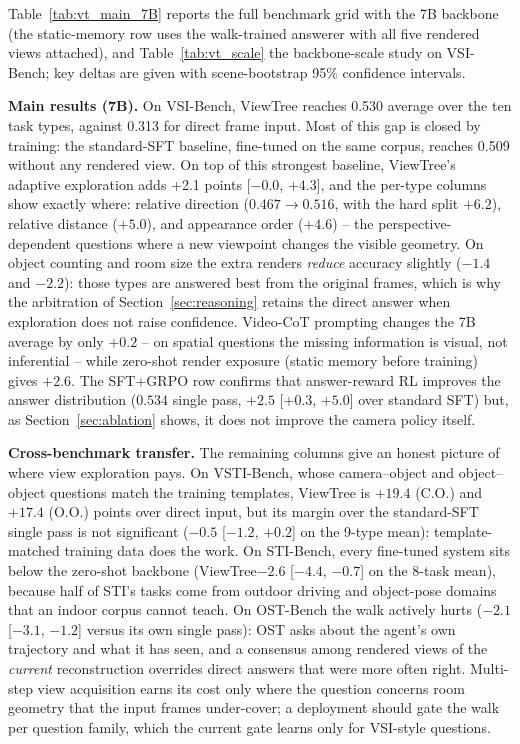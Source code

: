 \documentclass[sigconf,10pt]{acmart}
\newcommand{\system}{ViewTree\xspace}
\begin{document}
Table~\ref{tab:vt_main_7B} reports the full benchmark grid with the 7B backbone (the static-memory row uses the walk-trained answerer with all five rendered views attached), and Table~\ref{tab:vt_scale} the backbone-scale study on VSI-Bench; key deltas are given with scene-bootstrap 95\% confidence intervals.

\noindent\textbf{Main results (7B).} On VSI-Bench, \system reaches 0.530 average over the ten task types, against 0.313 for direct frame input. Most of this gap is closed by training: the standard-SFT baseline, fine-tuned on the same corpus, reaches 0.509 without any rendered view. On top of this strongest baseline, \system's adaptive exploration adds +2.1 points [$-0.0$, $+4.3$], and the per-type columns show exactly where: relative direction ($0.467 \rightarrow 0.516$, with the hard split $+6.2$), relative distance ($+5.0$), and appearance order ($+4.6$) -- the perspective-dependent questions where a new viewpoint changes the visible geometry. On object counting and room size the extra renders \emph{reduce} accuracy slightly ($-1.4$ and $-2.2$): those types are answered best from the original frames, which is why the arbitration of Section~\ref{sec:reasoning} retains the direct answer when exploration does not raise confidence. Video-CoT prompting changes the 7B average by only $+0.2$ -- on spatial questions the missing information is visual, not inferential -- while zero-shot render exposure (static memory before training) gives $+2.6$. The SFT+GRPO row confirms that answer-reward RL improves the answer distribution ($0.534$ single pass, $+2.5$ [$+0.3$, $+5.0$] over standard SFT) but, as Section~\ref{sec:ablation} shows, it does not improve the camera policy itself.

\noindent\textbf{Cross-benchmark transfer.} The remaining columns give an honest picture of where view exploration pays. On VSTI-Bench, whose camera--object and object--object questions match the training templates, \system is $+19.4$ (C.O.) and $+17.4$ (O.O.) points over direct input, but its margin over the standard-SFT single pass is not significant ($-0.5$ [$-1.2$, $+0.2$] on the 9-type mean): template-matched training data does the work. On STI-Bench, every fine-tuned system sits below the zero-shot backbone (\system $-2.6$ [$-4.4$, $-0.7$] on the 8-task mean), because half of STI's tasks come from outdoor driving and object-pose domains that an indoor corpus cannot teach. On OST-Bench the walk actively hurts ($-2.1$ [$-3.1$, $-1.2$] versus its own single pass): OST asks about the agent's own trajectory and what it has seen, and a consensus among rendered views of the \emph{current} reconstruction overrides direct answers that were more often right. Multi-step view acquisition earns its cost only where the question concerns room geometry that the input frames under-cover; a deployment should gate the walk per question family, which the current gate learns only for VSI-style questions.
\end{document}
